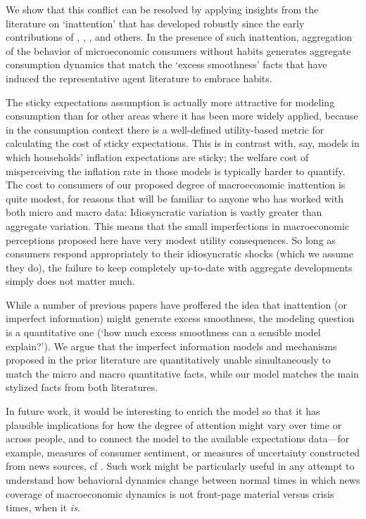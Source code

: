 \documentclass[titlepage]{\econtex}
\newcommand{\texname}{cAndCwithStickyE}
\begin{document}
We show that this conflict can be resolved by applying insights from the literature on `inattention' that has developed robustly since the early contributions of \cite{simsInattention}, \cite{woodfordImperfect}, \cite{mrSlumps}, and others.  In the presence of such inattention, aggregation of the behavior of microeconomic consumers without habits generates aggregate consumption dynamics that match the `excess smoothness' facts that have induced the representative agent literature to embrace habits.

The sticky expectations assumption is actually more attractive for modeling consumption than for other areas where it has been more widely applied, because in the consumption context there is a well-defined utility-based metric for calculating the cost of sticky expectations.  This is in contrast with, say, models in which households' inflation expectations are sticky; the welfare cost of misperceiving the inflation rate in those models is typically harder to quantify.  The cost to consumers of our proposed degree of macroeconomic inattention is quite modest, for reasons that will be familiar to anyone who has worked with both micro and macro data: Idiosyncratic variation is vastly greater than aggregate variation.  This means that the small imperfections in macroeconomic perceptions proposed here have very modest utility consequences.  So long as consumers respond appropriately to their idiosyncratic shocks (which we assume they do), the failure to keep completely up-to-date with aggregate developments simply does not matter much.

While a number of previous papers have proffered the idea that inattention (or imperfect information) might generate excess smoothness, the modeling question is a quantitative one (`how much excess smoothness can a sensible model explain?').  We argue that the imperfect information models and mechanisms proposed in the prior literature are quantitatively unable simultaneously to match the micro and macro quantitative facts, while our model matches the main stylized facts from both literatures.

In future work, it would be interesting to enrich the model so that it has plausible implications for how the degree of attention might vary over time or across people, and to connect the model to the available expectations data---for example, measures of consumer sentiment, or measures of uncertainty constructed from news sources, cf \cite{bbdUncertainty}.  Such work might be particularly useful in any attempt to understand how behavioral dynamics change between normal times in which news coverage of macroeconomic dynamics is not front-page material versus crisis times, when it {\it is}.


\processdelayedfloats

\small

\normalsize
\end{document}
